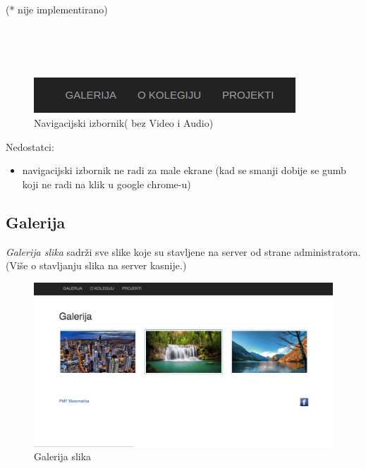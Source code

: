 \documentclass[]{article}
\begin{document}
\begin{footnotesize}
	(* nije implementirano)
\end{footnotesize}
\\
\\
\\
\begin{figure}[h]
	\centering
	\includegraphics[scale=0.5]{nav-bar}
	\caption{Navigacijski izbornik( bez Video i Audio)}
	\label{fig:mesh1}
\end{figure}

Nedostatci:
\begin{itemize}
	\item navigacijski izbornik ne radi za male ekrane (kad se smanji dobije se gumb koji ne radi na klik u google chrome-u) 
\end{itemize}

\newpage
\subsection{Galerija}
\textit{Galerija slika} sadrži sve slike koje su stavljene na server od strane administratora.
(Više o stavljanju slika na server kasnije.)
\\
\begin{figure}[h]
	\centering
	\includegraphics[scale=0.23]{galerija}
	\caption{Galerija slika}
	\label{fig:mesh1}
\end{figure}
\end{document}
